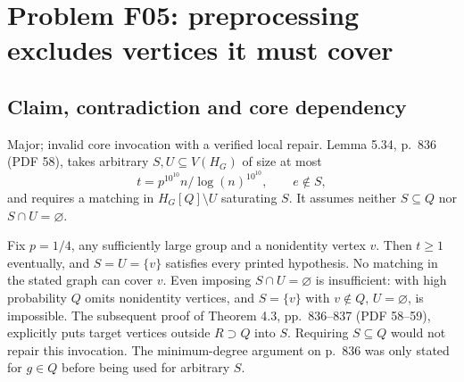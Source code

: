 \documentclass[10pt]{article}
\begin{document}
\section*{Problem F05: preprocessing excludes vertices it must cover}
\subsection*{Claim, contradiction and core dependency}
Major; invalid core invocation with a verified local repair. Lemma 5.34, p. 836 (PDF 58), takes arbitrary \(S,U\subseteq V(H_G)\) of size at most \[t=p^{10^{10}}n/\log(n)^{10^{10}},\qquad e\notin S,\] and requires a matching in \(H_G[Q]\setminus U\) saturating \(S\). It assumes neither \(S\subseteq Q\) nor \(S\cap U=\varnothing\).\par
Fix \(p=1/4\), any sufficiently large group and a nonidentity vertex \(v\). Then \(t\geq1\) eventually, and \(S=U=\{v\}\) satisfies every printed hypothesis. No matching in the stated graph can cover \(v\). Even imposing \(S\cap U=\varnothing\) is insufficient: with high probability \(Q\) omits nonidentity vertices, and \(S=\{v\}\) with \(v\notin Q\), \(U=\varnothing\), is impossible. The subsequent proof of Theorem 4.3, pp. 836–837 (PDF 58–59), explicitly puts target vertices outside \(R\supset Q\) into \(S\). Requiring \(S\subseteq Q\) would not repair this invocation. The minimum-degree argument on p. 836 was only stated for \(g\in Q\) before being used for arbitrary \(S\).\par
\end{document}
